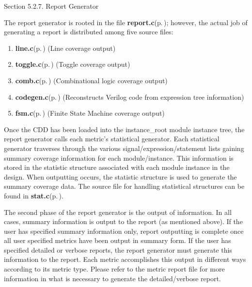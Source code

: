 \begin{Desc}
\item[Section 5.2.7. Report Generator]\end{Desc}
\begin{Desc}
\item[]The report generator is rooted in the file {\bf report.c}{\rm (p.\,\pageref{report_8c})}; however, the actual job of generating a report is distributed among five source files:\end{Desc}
\begin{Desc}
\item[]\begin{enumerate}
\item {\bf line.c}{\rm (p.\,\pageref{line_8c})} (Line coverage output) \item {\bf toggle.c}{\rm (p.\,\pageref{toggle_8c})} (Toggle coverage output) \item {\bf comb.c}{\rm (p.\,\pageref{comb_8c})} (Combinational logic coverage output) \item {\bf codegen.c}{\rm (p.\,\pageref{codegen_8c})} (Reconstructs Verilog code from expression tree information) \item {\bf fsm.c}{\rm (p.\,\pageref{fsm_8c})} (Finite State Machine coverage output) \end{enumerate}
\end{Desc}
\begin{Desc}
\item[]Once the CDD has been loaded into the instance\_\-root module instance tree, the report generator calls each metric's statistical generator. Each statistical generator traverses through the various signal/expression/statement lists gaining summary coverage information for each module/instance. This information is stored in the statistic structure associated with each module instance in the design. When outputting occurs, the statistic structure is used to generate the summary coverage data. The source file for handling statistical structures can be found in {\bf stat.c}{\rm (p.\,\pageref{stat_8c})}.\end{Desc}
\begin{Desc}
\item[]The second phase of the report generator is the output of information. In all cases, summary information is output to the report (as mentioned above). If the user has specified summary information only, report outputting is complete once all user specified metrics have been output in summary form. If the user has specified detailed or verbose reports, the report generator must generate this information to the report. Each metric accomplishes this output in different ways according to its metric type. Please refer to the metric report file for more information in what is necessary to generate the detailed/verbose report.\end{Desc}




